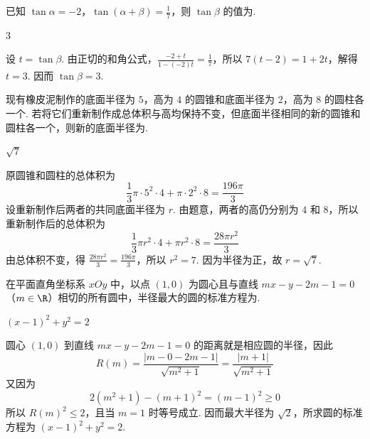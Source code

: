 \begin{problem}
已知 \(\tan \alpha = -2\)，\(\tan (\alpha + \beta) = \frac{1}{7}\)，则 \(\tan \beta\) 的值为\fillinblank{}.
\end{problem}

\begin{answer}
3
\end{answer}

\begin{solution}
设 \(t=\tan\beta\). 由正切的和角公式，\(\frac{-2+t}{1-(-2)t}=\frac{1}{7}\)，所以 \(7(t-2)=1+2t\)，解得 \(t=3\). 因而 \(\tan\beta=3\).
\end{solution}

\begin{problem}
现有橡皮泥制作的底面半径为 \(5\)，高为 \(4\) 的圆锥和底面半径为 \(2\)，高为 \(8\) 的圆柱各一个. 若将它们重新制作成总体积与高均保持不变，但底面半径相同的新的圆锥和圆柱各一个，则新的底面半径为\fillinblank{}.
\end{problem}

\begin{answer}
\(\sqrt{7}\)
\end{answer}

\begin{solution}
原圆锥和圆柱的总体积为
\[
\frac{1}{3}\pi\cdot5^{2}\cdot4+\pi\cdot2^{2}\cdot8=\frac{196\pi}{3}
\]
设重新制作后两者的共同底面半径为 \(r\). 由题意，两者的高仍分别为 \(4\) 和 \(8\)，所以重新制作后的总体积为
\[
\frac{1}{3}\pi r^{2}\cdot4+\pi r^{2}\cdot8=\frac{28\pi r^{2}}{3}
\]
由总体积不变，得 \(\frac{28\pi r^{2}}{3}=\frac{196\pi}{3}\)，所以 \(r^{2}=7\). 因为半径为正，故 \(r=\sqrt{7}\).
\end{solution}

\begin{problem}
在平面直角坐标系 \(xOy\) 中，以点 \((1,0)\) 为圆心且与直线 \(mx - y - 2m - 1 = 0\)（\(m \in \R\)）相切的所有圆中，半径最大的圆的标准方程为\fillinblank{}.
\end{problem}

\begin{answer}
\((x-1)^2+y^2=2\)
\end{answer}

\begin{solution}
圆心 \((1,0)\) 到直线 \(mx-y-2m-1=0\) 的距离就是相应圆的半径，因此
\[
R(m)=\frac{|m-0-2m-1|}{\sqrt{m^{2}+1}}=\frac{|m+1|}{\sqrt{m^{2}+1}}
\]
又因为
\[
2(m^{2}+1)-(m+1)^{2}=(m-1)^{2}\geqslant0
\]
所以 \(R(m)^{2}\leqslant2\)，且当 \(m=1\) 时等号成立. 因而最大半径为 \(\sqrt{2}\)，所求圆的标准方程为 \((x-1)^{2}+y^{2}=2\).
\end{solution}

